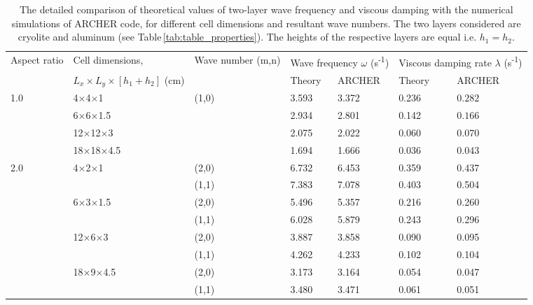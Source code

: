 \documentclass[aps,prfluids,reprint,superscriptaddress]{revtex4-2}
\begin{document}
\begin{table}%
	\caption{The detailed comparison of theoretical values of two-layer wave frequency and viscous damping with the numerical simulations of ARCHER code, for different cell dimensions and resultant wave numbers. The two layers considered are cryolite and aluminum (see Table\,\ref{tab:table_properties}). The heights of the respective layers are equal i.e. $h_1=h_2$.}
	\label{tab:table_sim}
	\begin{ruledtabular}
		\begin{tabular}{lllllll}
			\multirow{2}{*}{Aspect ratio} &
			Cell dimensions, & \multirow{2}{*}{Wave number (m,n)} &
			\multicolumn{2}{c}{Wave frequency $\omega$ (s\textsuperscript{-1})}
			& \multicolumn{2}{c}{Viscous damping rate $\lambda$ (s\textsuperscript{-1})} \\
			& $L_x \times L_y \times [h_1+h_2]$  (cm)	&   & Theory  & ARCHER & Theory  & ARCHER   \\
			\hline
			\multirow{4}{*}{1.0} & 4$\times$4$\times$1  & \multirow{4}{*}{(1,0)}           & 3.593 & 3.372 & 0.236   & $0.282$        \\
			&	6$\times$6$\times$1.5 &   & 
			2.934 & 2.801  & 0.142   & $0.166$        \\
			&	12$\times$12$\times$3 &   & 
			2.075 & 2.022  & 0.060    & $0.070$          \\
			&	18$\times$18$\times$4.5 &   & 
			1.694 & 1.666  & 0.036   & $0.043$       \\
			\hline
			\multirow{8}{*}{2.0} & \multirow{2}{*}{4$\times$2$\times$1} & (2,0) & 
			6.732 & 6.453 & 0.359   & 0.437          \\
			& & (1,1) & 
			7.383 & 7.078 & 0.403   & 0.504        \\
			\cline{2-7} 
			& \multirow{2}{*}{6$\times$3$\times$1.5}  & (2,0) & 
			5.496 & 5.357 & 0.216   & 0.260         \\
			& & (1,1) & 
			6.028 & 5.879 & 0.243   & 0.296         \\
			\cline{2-7} 
			& \multirow{2}{*}{12$\times$6$\times$3} & (2,0) & 
			3.887 & 3.858 & 0.090    & 0.095        \\
			& & (1,1) & 
			4.262 & 4.233 & 0.102   & 0.104      \\
			\cline{2-7} 
			& \multirow{2}{*}{18$\times$9$\times$4.5} & (2,0)  & 
			3.173 & 3.164 & 0.054   & 0.047         \\
			& & (1,1) & 
			3.480 & 3.471 & 0.061   & 0.051          \\

\end{tabular}
\end{ruledtabular}
\end{table}
\end{document}
